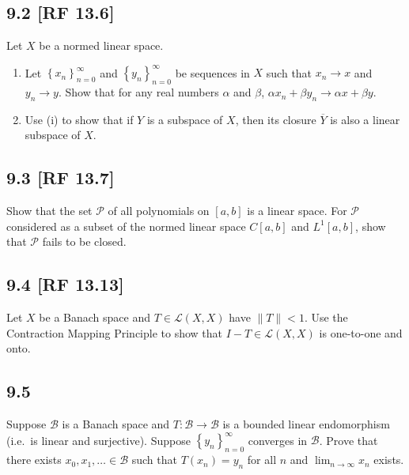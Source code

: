 \documentclass[12pt]{article}
\begin{document}
\subsection*{9.2 [RF 13.6]}
\begin{tcolorbox}
  Let $X$ be a normed linear space.
  \begin{enumerate}[label = (\roman*)]
    \item Let $\left\{ x_n \right\}_{n=0}^{\infty}$ and $\left\{ y_{n} \right\}_{n=0}^{\infty}$ be sequences in $X$ such that $x_n \rightarrow x$ and
      $y_n \rightarrow y$. Show that for any real numbers $\alpha$ and $\beta$, $\alpha x_n + \beta y_n \rightarrow \alpha x + \beta y$.
    \item Use (i) to show that if $Y$ is a subspace of $X$, then its closure $\overline{Y}$ is also a linear subspace of $X$.
  \end{enumerate}
\end{tcolorbox}

\subsection*{9.3 [RF 13.7]}
\begin{tcolorbox}
  Show that the set $\mathcal{P}$ of all polynomials on $[a,b]$ is a linear space. For $\mathcal{P}$ considered as a subset of the normed linear
  space $C[a,b]$ and $L^{1}[a,b]$, show that $\mathcal{P}$ fails to be closed.
\end{tcolorbox}


\subsection*{9.4 [RF 13.13]}
\begin{tcolorbox}
  Let $X$ be a Banach space and $T \in \mathcal{L}(X,X)$ have $\|T\| < 1$. Use the Contraction Mapping Principle to show that $I - T \in
  \mathcal{L}(X,X)$ is one-to-one and onto.
\end{tcolorbox}

\subsection*{9.5}
\begin{tcolorbox}
  Suppose $\mathcal{B}$ is a Banach space and $T : \mathcal{B} \rightarrow \mathcal{B}$ is a bounded linear endomorphism (i.e.\ is linear %
  and surjective). Suppose $\left\{ y_n \right\}_{n=0}^{\infty}$ converges in $\mathcal{B}$. Prove that there exists $x_0, x_1, \hdots \in \mathcal{B}$
  such that $T(x_n) = y_n$ for all $n$ and $\lim_{n\rightarrow\infty}x_n$ exists.
\end{tcolorbox}
\end{document}

